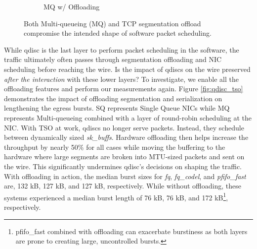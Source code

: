 \begin{figure}[t]
\begin{subfigure}[t]{0.32\linewidth}
    \caption{MQ w/ Offloading}
	\label{fig:qdisc_mq}
\end{subfigure}

\vspace{-2mm}
\caption{\small{Both Multi-queueing (MQ) and TCP segmentation offload compromise the intended shape of software packet scheduling.}}
\vspace{-2mm}
\end{figure}

While qdisc is the last layer to perform packet scheduling in the software, the traffic ultimately often passes through segmentation offloading and NIC scheduling before reaching the wire. Is the impact of qdiscs on the wire preserved \emph{after the interaction} with these lower layers?
To investigate, we enable all the offloading features and perform our measurements again. Figure \ref{fig:qdisc_tso} demonstrates the impact of offloading segmentation and serialization on lengthening the egress bursts. SQ represents Single Queue NICs while MQ represents Multi-queueing combined with a layer of round-robin scheduling at the NIC. With TSO at work, qdiscs no longer serve packets. Instead, they schedule between dynamically sized \textit{sk\_buffs}. Hardware offloading then helps increase the throughput by nearly 50\% for all cases while moving the buffering to the hardware where large segments are broken into MTU-sized packets and sent on the wire. This significantly undermines qdisc's decisions on shaping the traffic. With offloading in action, the median burst sizes for \textit{fq}, \textit{fq\_codel}, and \textit{pfifo\_fast} are, 132 kB, 127 kB, and 127 kB, respectively. While without offloading, these systems experienced a median burst length of 76 kB, 76 kB, and 172 kB\footnote{pfifo\_fast combined with offloading can exacerbate burstiness as both layers are prone to creating large, uncontrolled bursts.}, respectively.

